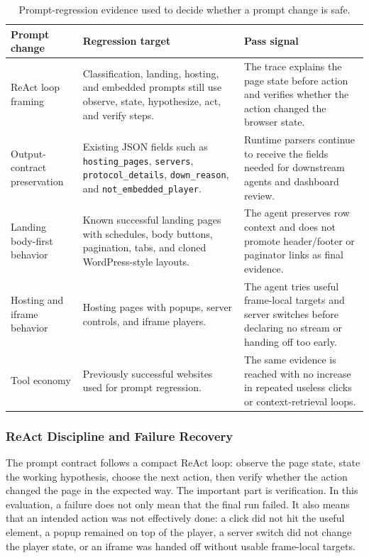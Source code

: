 

\begin{table}[H]
\centering
\small
\begin{tabularx}{\textwidth}{Q{3.2cm}Y Y}
\toprule
{}
Prompt change & Regression target & Pass signal \\
\midrule
ReAct loop framing & Classification, landing, hosting, and embedded prompts still use
observe, state, hypothesize, act, and verify steps. & The trace explains the page state
before action and verifies whether the action changed the browser state. \\
Output-contract preservation & Existing JSON fields such as \texttt{hosting\_pages},
\texttt{servers}, \texttt{protocol\_details}, \texttt{down\_reason}, and
\texttt{not\_embedded\_player}. & Runtime parsers continue to receive the fields needed
for downstream agents and dashboard review. \\
Landing body-first behavior & Known successful landing pages with schedules, body
buttons, pagination, tabs, and cloned WordPress-style layouts. & The agent preserves row
context and does not promote header/footer or paginator links as final evidence. \\
Hosting and iframe behavior & Hosting pages with popups, server controls, and iframe
players. & The agent tries useful frame-local targets and server switches before
declaring no stream or handing off too early. \\
Tool economy & Previously successful websites used for prompt regression. & The same
evidence is reached with no increase in repeated useless clicks or context-retrieval
loops. \\
\bottomrule
\end{tabularx}
\caption{Prompt-regression evidence used to decide whether a prompt change is safe.}
\label{tab:eval-prompt-regression}
\end{table}

\subsubsection{ReAct Discipline and Failure Recovery}

The prompt contract follows a compact ReAct loop: observe the page state, state the
working hypothesis, choose the next action, then verify whether the action changed the
page in the expected way. The important part is verification. In this evaluation, a
failure does not only mean that the final run failed. It also means that an intended
action was not effectively done: a click did not hit the useful element, a popup remained
on top of the player, a server switch did not change the player state, or an iframe was
handed off without usable frame-local targets.

